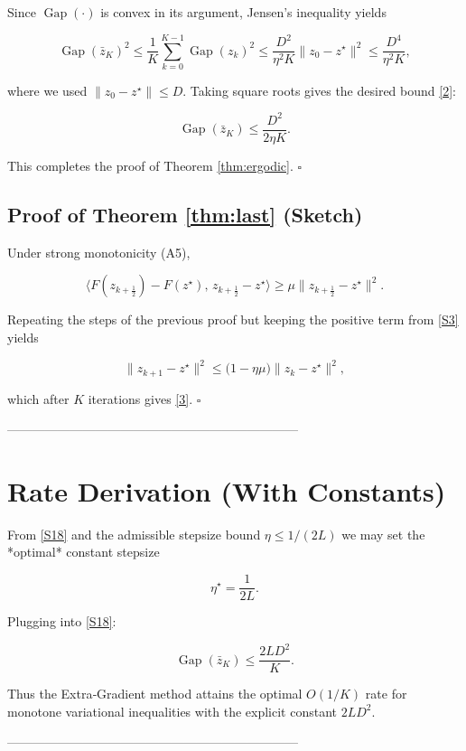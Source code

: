 \documentclass{article}
\newcommand{\gap}{\operatorname{Gap}}
\begin{document}
Since $\gap(\cdot)$ is convex in its argument, Jensen’s inequality yields

\[
\gap(\bar z_K)^{2}
\le \frac{1}{K}\sum_{k=0}^{K-1}\gap(z_k)^{2}
\le \frac{D^{2}}{\eta^{2}K}\|z_0-z^{\star}\|^{2}
\le \frac{D^{4}}{\eta^{2}K},
\tag{S17}
\]

where we used $\|z_0-z^{\star}\|\le D$. Taking square roots gives the desired bound \eqref{2}:

\[
\gap(\bar z_K)\le \frac{D^{2}}{2\eta K}.
\tag{S18}
\]

This completes the proof of Theorem \ref{thm:ergodic}. \hfill $\square$

\subsection*{Proof of Theorem \ref{thm:last} (Sketch)}
Under strong monotonicity (A5),

\[
\langle F(z_{k+\frac12})-F(z^{\star}),\,z_{k+\frac12}-z^{\star}\rangle
\ge\mu\|z_{k+\frac12}-z^{\star}\|^{2}.
\tag{S19}
\]

Repeating the steps of the previous proof but keeping the positive term from \eqref{S3} yields

\[
\|z_{k+1}-z^{\star}\|^{2}
\le\bigl(1-\eta\mu\bigr)\|z_k-z^{\star}\|^{2},
\tag{S20}
\]

which after $K$ iterations gives \eqref{3}. \hfill $\square$

---------------------------------------------------------------------

\section*{Rate Derivation (With Constants)}
From \eqref{S18} and the admissible stepsize bound $\eta\le 1/(2L)$ we may set the *optimal* constant stepsize  

\[
\eta^{\star}= \frac{1}{2L}.
\]

Plugging into \eqref{S18}:

\[
\gap(\bar z_K)\le \frac{2L D^{2}}{K}.
\tag{R1}
\]

Thus the Extra‑Gradient method attains the optimal $O(1/K)$ rate for monotone variational inequalities with the explicit constant $2L D^{2}$.

---------------------------------------------------------------------
\end{document}
